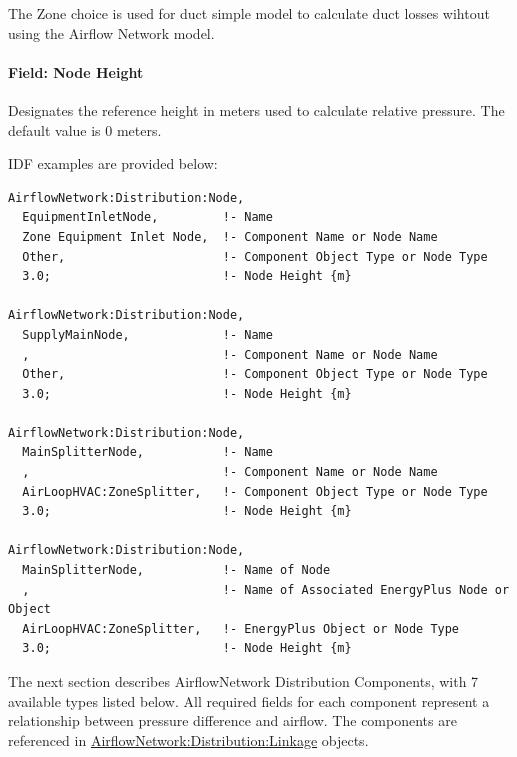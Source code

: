 The Zone choice is used for duct simple model to calculate duct losses wihtout using the Airflow Network model.

\paragraph{Field: Node Height}\label{field-node-height-1}

Designates the reference height in meters used to calculate relative pressure. The default value is 0 meters.

IDF examples are provided below:

\begin{lstlisting}
AirflowNetwork:Distribution:Node,
  EquipmentInletNode,         !- Name
  Zone Equipment Inlet Node,  !- Component Name or Node Name
  Other,                      !- Component Object Type or Node Type
  3.0;                        !- Node Height {m}

AirflowNetwork:Distribution:Node,
  SupplyMainNode,             !- Name
  ,                           !- Component Name or Node Name
  Other,                      !- Component Object Type or Node Type
  3.0;                        !- Node Height {m}

AirflowNetwork:Distribution:Node,
  MainSplitterNode,           !- Name
  ,                           !- Component Name or Node Name
  AirLoopHVAC:ZoneSplitter,   !- Component Object Type or Node Type
  3.0;                        !- Node Height {m}

AirflowNetwork:Distribution:Node,
  MainSplitterNode,           !- Name of Node
  ,                           !- Name of Associated EnergyPlus Node or Object
  AirLoopHVAC:ZoneSplitter,   !- EnergyPlus Object or Node Type
  3.0;                        !- Node Height {m}
\end{lstlisting}

The next section describes AirflowNetwork Distribution Components, with 7 available types listed below. All required fields for each component represent a relationship between pressure difference and airflow. The components are referenced in \hyperref[airflownetworkdistributionlinkage]{AirflowNetwork:Distribution:Linkage} objects.


